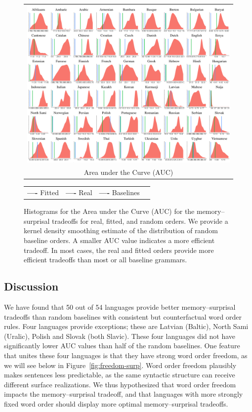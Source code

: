 \begin{figure}
	\begin{tabular}{c}
\includegraphics[width=\textwidth]{auc-table_MLE.pdf} \\
		Area under the Curve (AUC)
	\end{tabular}

\begin{center}
\begin{tabular}{llll}
\textbf{\textcolor{fitted}{----}} Fitted&
\textbf{\textcolor{real}{----}} Real&
\textbf{\textcolor{baseline}{----}} Baselines&
\end{tabular}
\end{center}
\caption{Histograms for the Area under the Curve (AUC) for the memory--surprisal tradeoffs for real, fitted, and random orders.
We provide a kernel density smoothing estimate of the distribution of random baseline orders.
A smaller AUC value indicates a more efficient tradeoff.
In most cases, the real and fitted orders provide more efficient tradeoffs than most or all baseline grammars.
}\label{fig:auc}
\end{figure}




\subsection{Discussion}\label{subsec:expt2-discussion}

We have found that 50 out of 54 languages provide better memory--surprisal tradeoffs than random baselines with consistent but counterfactual word order rules.
Four languages provide exceptions; these are Latvian (Baltic), North Sami (Uralic), Polish and Slovak (both Slavic). These four languages did not have significantly lower AUC values than half of the random baselines.
One feature that unites these four languages is that they have strong word order freedom, as we will see below in Figure~\ref{fig:freedom-surp}. %
Word order freedom plausibly makes sentences less predictable, as the same syntactic structure can receive different surface realizations.
We thus hypothesized that word order freedom  impacts the memory--surprisal tradeoff, and that languages with more strongly fixed word order should display more optimal memory--surprisal tradeoffs.


